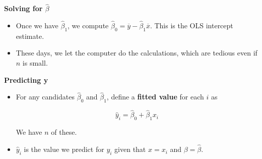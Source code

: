 \documentclass[notes=show]{beamer}
\begin{document}
\begin{frame}[plain]
\begin{center}
\textbf{Solving for $\widehat{\beta}$}
\end{center}

 \begin{itemize}
  \item Once we have $\hat{\beta}_{1}$, we compute $\hat{\beta}_{0}=\overline{y}-\hat{\beta}_{1}\overline{x}$. This is the OLS intercept estimate.

  \item These days, we let the computer do the calculations, which are tedious even if $n$ is small.
  
  \end{itemize}

\end{frame}

\begin{frame}[plain]
\begin{center}
\textbf{Predicting y}
\end{center}

\begin{itemize}

\item For any candidates $\hat{\beta}_{0}$ and $\hat{\beta}_{1}$, define a \textbf{fitted value} for each $i$ as


	\begin{equation}
	\hat{y}_{i}=\hat{\beta}_{0}+\hat{\beta}_{1}x_{i}
	\end{equation}

We have $n$ of these. 
\item $\hat{y}_i$ is the value we predict for $y_{i}$ given that $x=x_{i}$ and $\beta=\hat{\beta}$.
\end{itemize}
\end{frame}
\end{document}
